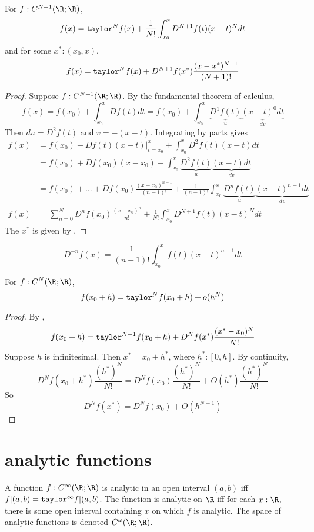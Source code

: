 \documentclass[10pt]{scrartcl}
\numberwithin{thms}{section}
\begin{document}
\begin{theorem}
  \label{taylor-thm-lagrange}
  For $f:C^{N+1}(\R;\R)$, 
  \[
  f(x)=\mathtt{taylor}^Nf(x)+\frac 1{N!}\int_{x_0}^xD^{N+1}f(t)(x-t)^Ndt
  \]
  and for some $x^*:(x_0,x)$,  
  \[
  f(x)=\mathtt{taylor}^Nf(x)+D^{N+1}f(x^*)\frac{(x-x^*)^{N+1}}{(N+1)!}
  \]
\end{theorem}
\begin{proof}
  Suppose $f:C^{N+1}(\R;\R)$. 
  By the fundamental theorem of calculus,
  \[
  f(x)=f(x_0)+\int_{x_0}^x Df(t)dt=f(x_0)+\int_{x_0}^x\underbrace{D^1f(t)}_{u}\underbrace{(x-t)^0dt}_{dv}
  \]
  Then $du=D^2f(t)$ and $v=-(x-t)$. 
  Integrating by parts gives
  \begin{align*}
    f(x)&=f(x_0)-Df(t)(x-t)\biggl|_{t=x_0}^x+\int_{x_0}^xD^2f(t)(x-t)dt\\
        &=f(x_0)+Df(x_0)(x-x_0)+\int_{x_0}^x\underbrace{D^2f(t)}_u\underbrace{(x-t)dt}_{dv}\\
        &=f(x_0)+\dots+Df(x_0)\frac{(x-x_0)^{n-1}}{(n-1)!} + \frac 1 {(n-1)!}\int_{x_0}^x \underbrace{D^nf(t)}_{u}\underbrace{(x-t)^{n-1}dt}_{dv}\\
    f(x)&=\sum_{n=0}^{N}D^nf(x_0)\frac{(x-x_0)^n}{n!}+\frac 1 {N!}\int_{x_0}^xD^{N+1}f(t)(x-t)^{N}dt
  \end{align*}
The $x^*$ is given by .
\end{proof}
\begin{cor}
  \[
  D^{-n}f(x)=\frac 1 {(n-1)!}\int_{x_0}^xf(t)(x-t)^{n-1}dt
  \]
  \cite{wiki:cauchy-rep-int}
\end{cor}

\begin{cor}
  For $f:C^N(\R;\R)$, 
  \[
  f(x_0+h)= \mathtt{taylor}^Nf(x_0+h)+o(h^N)
  \]
\end{cor}
\begin{proof}
  By , 
  \[
  f(x_0+h)=\mathtt{taylor}^{N-1}f(x_0+h)+D^Nf(x^*)\frac{(x^*-x_0)^N}{N!}
  \]
  Suppose $h$ is infinitesimal. Then $x^*=x_0+h^*$, where $h^*:[0,h]$. By continuity,
  \[
  D^Nf(x_0+h^*)\frac{(h^*)^N}{N!}= D^Nf(x_0)\frac{(h^*)^N}{N!}+O(h^*)\frac{(h^*)^N}{N!}
  \]
  So
  \[
  D^Nf(x^*)= D^Nf(x_0)+O(h^{N+1})
  \]
\end{proof}

\section{analytic functions}
\begin{defn}
  A function $f:C^\infty(\R;\R)$ is analytic in an open interval $(a,b)$ iff $f|(a,b)=\mathtt{taylor}^\infty f|(a,b)$. The function is analytic on $\R$ iff for each $x:\R$, there is some open interval containing $x$ on which $f$ is analytic. The space of analytic functions is denoted $C^\omega(\R;\R)$. 
\end{defn}
\end{document}
